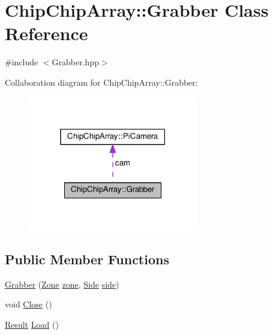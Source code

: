 \hypertarget{classChipChipArray_1_1Grabber}{\section{Chip\+Chip\+Array\+:\+:Grabber Class Reference}
\label{classChipChipArray_1_1Grabber}
}


{\ttfamily \#include $<$Grabber.\+hpp$>$}



Collaboration diagram for Chip\+Chip\+Array\+:\+:Grabber\+:
\nopagebreak
\begin{figure}[H]
\begin{center}
\leavevmode
\includegraphics[width=210pt]{classChipChipArray_1_1Grabber__coll__graph}
\end{center}
\end{figure}
\subsection*{Public Member Functions}
\begin{DoxyCompactItemize}
\item 
\hyperlink{classChipChipArray_1_1Grabber_a7333f40c135fbe92d59651f75032b4e7}{Grabber} (\hyperlink{definitions_8hpp_adbd1e7a33d3e1751c7b2aa2562d0ecb9}{Zone} \hyperlink{classChipChipArray_1_1Grabber_ab57efe6e0b6f369b19528285a278d967}{zone}, \hyperlink{definitions_8hpp_a03325a8a9d4f105db5e37dd587128142}{Side} \hyperlink{classChipChipArray_1_1Grabber_a8afbaefae7c767c862fd1bf13968539b}{side})
\item 
void \hyperlink{classChipChipArray_1_1Grabber_aacf089ceb4aa5b263c2cc702fb3daf74}{Close} ()
\item 
\hyperlink{definitions_8hpp_ab84ebabb02540c4a7ec341a213abf1dc}{Result} \hyperlink{classChipChipArray_1_1Grabber_a56639f8f9ba9468bce4b6d69ceb2eb54}{Load} ()
\end{DoxyCompactItemize}
